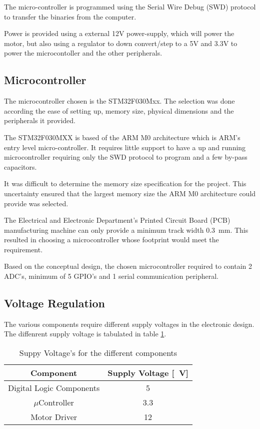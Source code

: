 The micro-controller is programmed using the Serial Wire Debug (SWD) protocol to transfer the binaries from the computer.

Power is provided using a external 12V power-supply, which will power the motor, but also using a regulator to down convert/step to a 5V and 3.3V to power the microcontoller and the other peripherals.


\subsection{Microcontroller}
The microcontroller chosen is the STM32F030Mxx. The selection was done according the ease of setting up, memory size, physical dimensions and the peripherals it provided.

The STM32F030MXX is based of the ARM M0 architecture which is ARM's entry level micro-controller. It requires little support to have a up and running microcontroller requiring only the SWD protocol to program and a few by-pass capacitors.

It was difficult to determine the memory size specification for the project. This uncertainty ensured that the largest memory size the ARM M0 architecture could provide was selected.

The Electrical and Electronic Department's Printed Circuit Board (PCB) manufacturing machine can only provide a  minimum track width \SI{0.3}{mm}. This resulted in choosing a microcontroller whose footprint would meet the requirement.

Based on the conceptual design, the chosen microcontroller required to contain 2 ADC's, minimum of 5 GPIO's and 1 serial communication peripheral.

\subsection{Voltage Regulation}

The various components require different supply voltages in the electronic design. The diffenrent supply voltage is tabulated in table \ref{table:supplyVoltage}.

\begin{table}[]
	\centering
	\begin{tabular}{|c|c|}
		\hline
		Component & Supply Voltage [\SI{}{V}] \\
		\hline
		\hline
		Digital Logic Components & \SI{5}{} \\
		\hline
		$\mu$Controller & \SI{3.3}{} \\
		\hline
		Motor Driver & \SI{12}{} \\
		\hline
	\end{tabular}
	\caption{Suppy Voltage's for the different components}
	\label{table:supplyVoltage}
\end{table}


